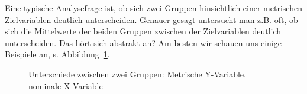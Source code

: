 \documentclass[
  letterpaper,
  oneside,
  open=any]{scrbook}
\theoremstyle{definition}
\theoremstyle{definition}
\theoremstyle{definition}
\theoremstyle{remark}
\begin{document}
Eine typische Analysefrage ist, ob sich zwei Gruppen hinsichtlich einer
metrischen Zielvariablen deutlich unterscheiden. Genauer gesagt
untersucht man z.B. oft, ob sich die Mittelwerte der beiden Gruppen
zwischen der Zielvariablen deutlich unterscheiden. Das hört sich
abstrakt an? Am besten wir schauen uns einige Beispiele an, s.
Abbildung~\ref{fig-compare-groups1}.

\begin{figure}

\begin{minipage}{0.50\linewidth}



\end{minipage}%
%
\begin{minipage}{0.50\linewidth}



\end{minipage}%

\caption{\label{fig-compare-groups1}Unterschiede zwischen zwei Gruppen:
Metrische Y-Variable, nominale X-Variable}

\end{figure}%
\end{document}
